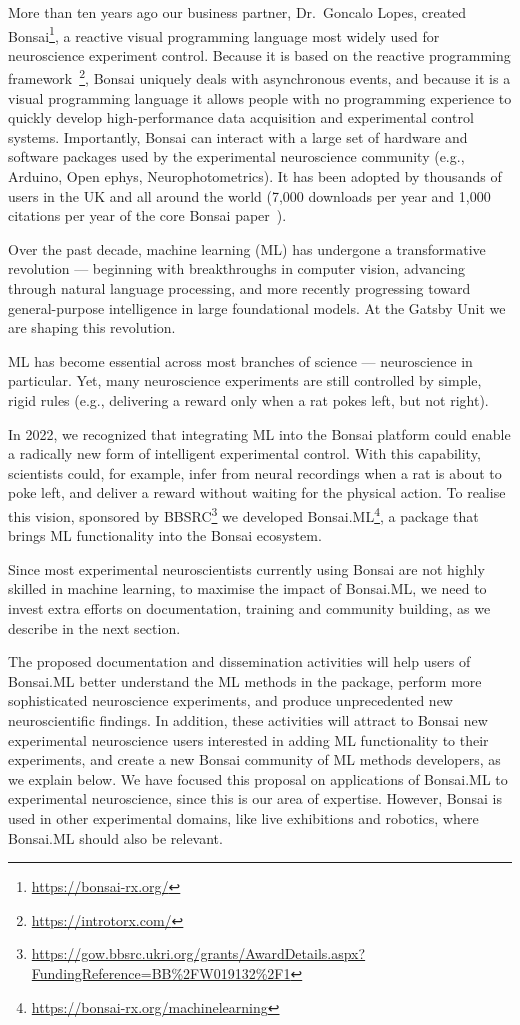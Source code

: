 More than ten years ago our business partner, Dr.~Goncalo Lopes, created
Bonsai\footnote[1]{\url{https://bonsai-rx.org/}}, a reactive visual programming
language most widely used for neuroscience experiment control.
%
Because it is based on the reactive programming
framework~\footnote[2]{\url{https://introtorx.com/}}, Bonsai uniquely deals
with asynchronous events,
%
and because it is a visual programming language it allows people with no
programming experience to quickly develop high-performance data acquisition and
experimental control systems.
%
Importantly, Bonsai can interact with a large set of hardware and software
packages used by the experimental neuroscience community (e.g., Arduino, Open
ephys, Neurophotometrics). It has been adopted by thousands of users in the UK
and all around the world (7,000 downloads per year and 1,000 citations per year
of the core Bonsai paper~\citep{lopesEtAl15}).

Over the past decade, machine learning (ML) has undergone a transformative
revolution — beginning with breakthroughs in computer vision, advancing through
natural language processing, and more recently progressing toward
general-purpose intelligence in large foundational models.
%
At the Gatsby Unit we are shaping this revolution.

ML has become essential across most branches of science — neuroscience in
particular. Yet, many neuroscience experiments are still controlled by simple,
rigid rules (e.g., delivering a reward only when a rat pokes left, but not
right).

In 2022, we recognized that integrating ML into the Bonsai platform could
enable a radically new form of intelligent experimental control. With this
capability, scientists could, for example, infer from neural recordings when a
rat is about to poke left, and deliver a reward without waiting for the
physical action.
%
To realise this vision, sponsored by
BBSRC\footnote[3]{\url{https://gow.bbsrc.ukri.org/grants/AwardDetails.aspx?FundingReference=BB\%2FW019132\%2F1}}
we developed
Bonsai.ML\footnote[4]{\url{https://bonsai-rx.org/machinelearning}}, a package
that brings ML functionality into the Bonsai ecosystem.

Since most experimental neuroscientists currently using Bonsai are not highly
skilled in machine learning, to maximise the impact of Bonsai.ML, we need to
invest extra efforts on documentation, training and community building, as we
describe in the next section.

The proposed documentation and dissemination activities will help users of
Bonsai.ML better understand the ML methods in the package, perform more
sophisticated neuroscience experiments, and produce unprecedented new
neuroscientific findings.
%
In addition, these activities will attract to Bonsai new experimental
neuroscience users interested in adding ML functionality to their experiments,
and create a new Bonsai community of ML methods developers, as we
explain below.
%
We have focused this proposal on applications of Bonsai.ML to experimental
neuroscience, since this is our area of expertise. However, Bonsai is used in
other experimental domains, like live exhibitions and robotics, where Bonsai.ML
should also be relevant.

